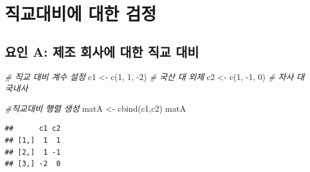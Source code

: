 \documentclass[
]{book}
\newenvironment{Shaded}{\begin{snugshade}}{\end{snugshade}}
\newcommand{\AttributeTok}[1]{\textcolor[rgb]{0.77,0.63,0.00}{#1}}
\newcommand{\CommentTok}[1]{\textcolor[rgb]{0.56,0.35,0.01}{\textit{#1}}}
\newcommand{\DecValTok}[1]{\textcolor[rgb]{0.00,0.00,0.81}{#1}}
\newcommand{\FunctionTok}[1]{\textcolor[rgb]{0.00,0.00,0.00}{#1}}
\newcommand{\NormalTok}[1]{#1}
\newcommand{\OtherTok}[1]{\textcolor[rgb]{0.56,0.35,0.01}{#1}}
\newcommand{\SpecialCharTok}[1]{\textcolor[rgb]{0.00,0.00,0.00}{#1}}
\newcommand{\StringTok}[1]{\textcolor[rgb]{0.31,0.60,0.02}{#1}}
\begin{document}
\newpage

\hypertarget{uxc9c1uxad50uxb300uxbe44uxc5d0-uxb300uxd55c-uxac80uxc815}{%
\section{직교대비에 대한 검정}\label{uxc9c1uxad50uxb300uxbe44uxc5d0-uxb300uxd55c-uxac80uxc815}}

\hypertarget{uxc694uxc778-a-uxc81cuxc870-uxd68cuxc0acuxc5d0-uxb300uxd55c-uxc9c1uxad50-uxb300uxbe44}{%
\subsection{요인 A: 제조 회사에 대한 직교 대비}\label{uxc694uxc778-a-uxc81cuxc870-uxd68cuxc0acuxc5d0-uxb300uxd55c-uxc9c1uxad50-uxb300uxbe44}}

\begin{Shaded}
\begin{Highlighting}[]
\CommentTok{\# 직교 대비 계수 설정}
\NormalTok{c1 }\OtherTok{\textless{}{-}} \FunctionTok{c}\NormalTok{(}\DecValTok{1}\NormalTok{, }\DecValTok{1}\NormalTok{, }\SpecialCharTok{{-}}\DecValTok{2}\NormalTok{) }\CommentTok{\# 국산 대 외제}
\NormalTok{c2 }\OtherTok{\textless{}{-}} \FunctionTok{c}\NormalTok{(}\DecValTok{1}\NormalTok{, }\SpecialCharTok{{-}}\DecValTok{1}\NormalTok{, }\DecValTok{0}\NormalTok{) }\CommentTok{\# 자사 대 국내사}

\CommentTok{\#직교대비 행렬 생성  }
\NormalTok{matA }\OtherTok{\textless{}{-}} \FunctionTok{cbind}\NormalTok{(c1,c2)}
\NormalTok{matA}
\end{Highlighting}
\end{Shaded}

\begin{verbatim}
##      c1 c2
## [1,]  1  1
## [2,]  1 -1
## [3,] -2  0
\end{verbatim}

\begin{Shaded}
\end{Shaded}
\end{document}
